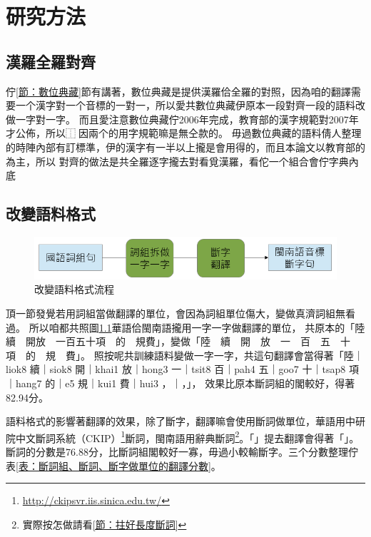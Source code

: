 \chapter{研究方法}
\label{章：研究方法}

\section{漢羅全羅對齊}
\label{節：漢羅全羅對齊}
佇\ref{節：數位典藏}節有講著，數位典藏是提供漢羅佮全羅的對照，因為咱的翻譯需要一个漢字對一个音標的一對一，所以愛共數位典藏伊原本一段對齊一段的語料改做一字對一字。
而且愛注意數位典藏佇2006年完成，教育部的漢字規範對2007年才公佈，所以⿰因兩个的用字規範嘛是無仝款的。
毋過數位典藏的語料倩人整理的時陣內部有訂標準，伊的漢字有一半以上攏是會用得的，而且本論文以教育部的為主，所以
對齊的做法是共全羅逐字攏去對看覓漢羅，看佗一个組合會佇字典內底




\section{改變語料格式}
\label{節：改變語料格式}

\begin{figure}
\centerline{\includegraphics[keepaspectratio,width=40em]{圖/改變語料格式}}
\caption{改變語料格式流程}
\label{改變語料格式}
\end{figure}

頂一節發覺若用詞組當做翻譯的單位，會因為詞組單位傷大，變做真濟詞組無看過。
所以咱都共照圖\ref{改變語料格式}華語佮閩南語攏用一字一字做翻譯的單位，
共原本的「陸續　開放　一百五十項　的　規費」，變做「陸　續　開　放　一　百　五　十　項　的　規　費」。
照按呢共訓練語料變做一字一字，共這句翻譯會當得著「陸｜liok8 續｜siok8 開｜khai1 放｜hong3 一｜tsit8 百｜pah4 五｜goo7 十｜tsap8 項｜hang7 的｜e5 規｜kui1 費｜hui3 ，｜，」，
效果比原本斷詞組的閣較好，得著82.94分。

語料格式的影響著翻譯的效果，除了斷字，翻譯嘛會使用斷詞做單位，華語用中研院中文斷詞系統（CKIP）\footnote{\url{http://ckipsvr.iis.sinica.edu.tw/}}斷詞，閩南語用辭典斷詞\footnote{實際按怎做請看\ref{節：拄好長度斷詞}}。「」提去翻譯會得著「」。斷詞的分數是76.88分，比斷詞組閣較好一寡，毋過小較輸斷字。三个分數整理佇表\ref{表：斷詞組、斷詞、斷字做單位的翻譯分數}。

